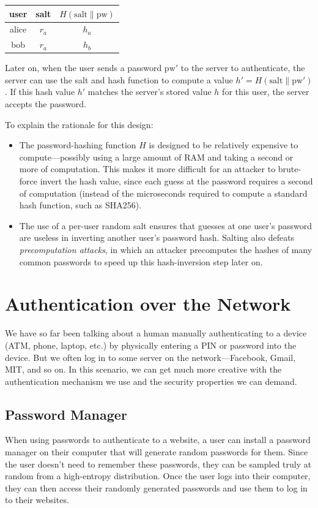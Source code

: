 \medskip
\begin{tabular}{c|c|c}
  user & salt & $H(\text{salt}\|\text{pw})$ \\
	\hline
	alice & $r_a$ & $h_a$ \\
	bob & $r_a$ & $h_b$ \\
\end{tabular}
\medskip

Later on, when the user sends a password $\text{pw}'$ to the server to authenticate, 
the server can use the salt and hash function to compute a value $h' = H(\text{salt}\|\text{pw}')$.
If this hash value $h'$ matches the server's stored value $h$ for this user,
the server accepts the password.

To explain the rationale for this design:
\begin{itemize}
  \item The password-hashing function $H$ is designed to be relatively expensive
        to compute---possibly using a large amount of RAM and taking a second or 
        more of computation.
        This makes it more difficult for an attacker to brute-force invert the
        hash value, since each guess at the password requires a second of computation
        (instead of the microseconds required to compute a standard hash function,
        such as SHA256).
  \item The use of a per-user random salt ensures that guesses at one user's password
        are useless in inverting another user's password hash.
        Salting also defeats \emph{precomputation attacks}, in which an attacker
        precomputes the hashes of many common passwords to speed up this hash-inversion
        step later on.
\end{itemize}


\section{Authentication over the Network}
We have so far been talking about a human manually
authenticating to a device (ATM, phone, laptop, etc.)
by physically entering a PIN or password into the device.
But we often log in to some server on the network---Facebook,
Gmail, MIT, and so on. 
In this scenario, we can get much more creative
with the authentication mechanism we use and the
security properties we can demand.

\subsection{Password Manager}
When using passwords to authenticate to a website, 
a user can install a password manager on their
computer that will generate random passwords for them.
Since the user doesn't need to remember these passwords,
they can be sampled truly at random from a high-entropy distribution.
Once the user logs into their computer, they can
then access their randomly generated passwords and
use them to log in to their websites. 

